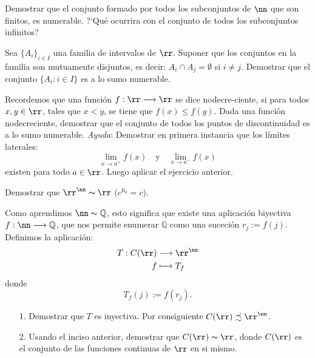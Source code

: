 \begin{ejercicio}{} Demostrar que el conjunto formado por todos los
subconjuntos de $\nn$ que son finitos, es numerable.
?`Qué ocurrira con el conjunto de todos los subconjuntos
infinitos?
\end{ejercicio}
\begin{ejercicio}{} Sea $\{A_i\}_{i\in I}$ una familia de intervalos
de $\rr$. Suponer que los conjuntos en la familia son mutuamente
disjuntos, es decir: $A_i\cap A_j=\emptyset$ si $i\neq j$.
Demostrar que el conjunto $\{A_i:i\in I\}$ es a lo sumo numerable.
\end{ejercicio}
\begin{ejercicio}{} Recordemos que una función
$f:\rr\longrightarrow\rr$ se dice nodecre-\newline ciente, si para
todos $x,y\in\rr$, tales que $x<y$, se tiene que $f(x)\leq f(y)$.
Dada una función nodecreciente, demostrar que el conjunto de
todos los puntos de discontinuidad es a lo sumo numerable.
\textit{Ayuda}: Demostrar en primera instancia que los
límites laterales:
\[
    \lim\limits_{x\rightarrow a^+}f(x)\quad\text{y}\quad \lim\limits_{x\rightarrow
    a^-}f(x)
\]
existen para todo $a\in\rr$. Luego aplicar el ejercicio anterior.
\end{ejercicio}
\begin{ejercicio}{} Demostrar que $\rr^{\nn}\thicksim\rr$ ($c^{\aleph_0}=c$).
\end{ejercicio}
\begin{ejercicio}{} Como aprendimos $\nn\thicksim\mathbb{Q}$, esto
significa que existe una aplicación biyectiva
$f:\nn\longrightarrow\mathbb{Q}$, que nos permite enumerar
$\mathbb{Q}$ como una suceción $r_j:=f(j)$. Definimos la
aplicación:
\[\begin{split}
              T:C(\rr)&\longrightarrow \rr^{\nn}\\
              f        &\longmapsto T_f\\
\end{split}\]
donde
\[
  T_f(j):=f(r_j).
\]
\begin{itemize}
   \item [1.] Demostrar que $T$ es inyectiva. Por consiguiente
   $C(\rr)\precsim\rr^{\nn}$.
   \item[2.] Usando el inciso anterior, demostrar que
    $C(\rr)\thicksim\rr$, donde $C(\rr)$ es el conjunto
    de las funciones continuas de $\rr$ en si mismo.
\end{itemize}
\end{ejercicio}
